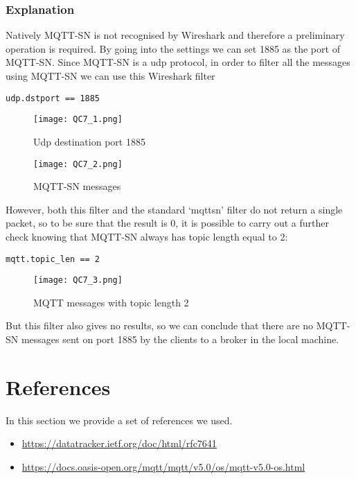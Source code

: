 \subsubsection{Explanation}
Natively MQTT-SN is not recognised by Wireshark and therefore a preliminary operation is required. By going into the settings we can set 1885 as the port of MQTT-SN.
Since MQTT-SN is a udp protocol, in order to filter all the messages using MQTT-SN we can use this Wireshark filter
\begin{verbatim}
udp.dstport == 1885
\end{verbatim}
\begin{figure}[H]
    \centering
    \texttt{[image: QC7\_1.png]}
    \caption{Udp destination port 1885}
\end{figure}
\begin{figure}[H]
    \centering
    \texttt{[image: QC7\_2.png]}
    \caption{MQTT-SN messages}
\end{figure}
However, both this filter and the standard ‘mqttsn’ filter do not return a single packet, so to be sure that the result is 0, it is possible to carry out a further check knowing that MQTT-SN always has topic length equal to 2:
\begin{verbatim}
mqtt.topic_len == 2
\end{verbatim}
\begin{figure}[H]
    \centering
    \texttt{[image: QC7\_3.png]}
    \caption{MQTT messages with topic length 2}
\end{figure}
But this filter also gives no results, so we can conclude that there are no MQTT-SN messages sent on port 1885 by the clients to a broker in the local machine.

\section{References}
In this section we provide a set of references we used.
\begin{itemize}
	\item \url{https://datatracker.ietf.org/doc/html/rfc7641}
	\item \url{https://docs.oasis-open.org/mqtt/mqtt/v5.0/os/mqtt-v5.0-os.html}
\end{itemize}

























